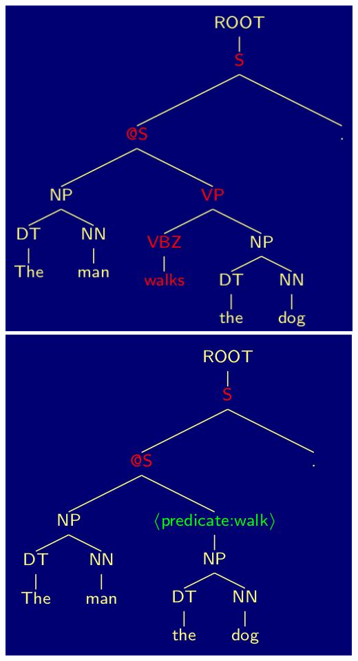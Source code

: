 \includegraphics[width=\textwidth]{media/relation_extraction_5.jpg}
\includegraphics[width=\textwidth]{media/relation_extraction_6.jpg}
